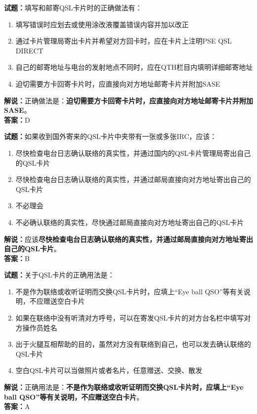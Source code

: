 \documentclass{ctexbook}
\begin{document}
\bigskip


\noindent\textbf{试题：}填写和邮寄QSL卡片时的正确做法有：
\begin{enumerate}[leftmargin=3em]
\item 填写错误时应划去或使用涂改液覆盖错误内容并加以改正
\item 通过卡片管理局寄出卡片并希望对方回卡时，应在卡片上注明PSE QSL DIRECT
\item 自己的邮寄地址与电台的发射地点不同时，应在QTH栏目内填明详细邮寄地址
\item 迫切需要方卡回寄卡片时，应直接向对方地址邮寄卡片并附加SASE
\end{enumerate}
\noindent\textbf{解说：}正确做法是：\textbf{迫切需要方卡回寄卡片时，应直接向对方地址邮寄卡片并附加SASE}。\\\noindent\textbf{答案：}D



\bigskip


\noindent\textbf{试题：}如果收到国外寄来的QSL卡片中夹带有一张或多张IRC，应该：
\begin{enumerate}[leftmargin=3em]
\item 尽快检查电台日志确认联络的真实性，并通过国内的QSL卡片管理局寄出自己的QSL卡片
\item 尽快检查电台日志确认联络的真实性，并通过邮局直接向对方地址寄出自己的QSL卡片
\item 不必理会
\item 不必确认联络的真实性，尽快通过邮局直接向对方地址寄出自己的QSL卡片
\end{enumerate}
\noindent\textbf{解说：}应该\textbf{尽快检查电台日志确认联络的真实性，并通过邮局直接向对方地址寄出自己的QSL卡片}。\\\noindent\textbf{答案：}B




\bigskip


\noindent\textbf{试题：}关于QSL卡片的正确用法是：
\begin{enumerate}[leftmargin=3em]
\item 不是作为联络或收听证明而交换QSL卡片时，应填上“Eye ball QSO”等有关说明，不应赠送空白卡片
\item 如果在联络中没有听清对方呼号，可以在寄发QSL卡片的对方台名栏中填写对方操作员姓名
\item 出于火腿互相帮助的目的，虽然对方没有联络到自己，也可以发去确认联络的QSL卡片
\item 空白QSL卡片可以当做照片或者名片，任意赠送、交换、散发
\end{enumerate}
\noindent\textbf{解说：}正确用法是：\textbf{不是作为联络或收听证明而交换QSL卡片时，应填上“Eye ball QSO”等有关说明，不应赠送空白卡片}。\\\noindent\textbf{答案：}A
\end{document}
